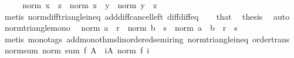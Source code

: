\begin{isabellebody}
%
\isadelimproof
%
\endisadelimproof
%
\isatagproof
{}\isamarkupfalse%
\ {\isacharminus}{\kern0pt}\isanewline
\ \ \isamarkupfalse%
\ {\isachardoublequoteopen}norm\ {\isacharparenleft}{\kern0pt}x\ {\isacharminus}{\kern0pt}\ z{\isacharparenright}{\kern0pt}\ {\isasymle}\ norm\ {\isacharparenleft}{\kern0pt}x\ {\isacharminus}{\kern0pt}\ y{\isacharparenright}{\kern0pt}\ {\isacharplus}{\kern0pt}\ norm\ {\isacharparenleft}{\kern0pt}y\ {\isacharminus}{\kern0pt}\ z{\isacharparenright}{\kern0pt}{\isachardoublequoteclose}\isanewline
\ \ \ \ \isamarkupfalse%
\ {\isacharparenleft}{\kern0pt}metis\ norm{\isacharunderscore}{\kern0pt}diff{\isacharunderscore}{\kern0pt}triangle{\isacharunderscore}{\kern0pt}ineq\ add{\isacharunderscore}{\kern0pt}diff{\isacharunderscore}{\kern0pt}cancel{\isacharunderscore}{\kern0pt}left{\isacharprime}{\kern0pt}\ diff{\isacharunderscore}{\kern0pt}diff{\isacharunderscore}{\kern0pt}eq{}{\isacharparenright}{\kern0pt}\isanewline
\ \ \isamarkupfalse%
\ that\ \isamarkupfalse%
\ {\isacharquery}{\kern0pt}thesis\ \isamarkupfalse%
\ auto\isanewline
{}\isamarkupfalse%
%
\endisatagproof
{\isafoldproof}%
%
\isadelimproof
\isanewline
%
\endisadelimproof
\isanewline
{}\isamarkupfalse%
\ norm{\isacharunderscore}{\kern0pt}triangle{\isacharunderscore}{\kern0pt}mono{\isacharcolon}{\kern0pt}\isanewline
\ \ {\isachardoublequoteopen}norm\ a\ {\isasymle}\ r\ {\isasymLongrightarrow}\ norm\ b\ {\isasymle}\ s\ {\isasymLongrightarrow}\ norm\ {\isacharparenleft}{\kern0pt}a\ {\isacharplus}{\kern0pt}\ b{\isacharparenright}{\kern0pt}\ {\isasymle}\ r\ {\isacharplus}{\kern0pt}\ s{\isachardoublequoteclose}\isanewline
%
\isadelimproof
\ \ %
\endisadelimproof
%
\isatagproof
{}\isamarkupfalse%
\ {\isacharparenleft}{\kern0pt}metis\ {\isacharparenleft}{\kern0pt}mono{\isacharunderscore}{\kern0pt}tags{\isacharparenright}{\kern0pt}\ add{\isacharunderscore}{\kern0pt}mono{\isacharunderscore}{\kern0pt}thms{\isacharunderscore}{\kern0pt}linordered{\isacharunderscore}{\kern0pt}semiring{\isacharparenleft}{\kern0pt}{}{\isacharparenright}{\kern0pt}\ norm{\isacharunderscore}{\kern0pt}triangle{\isacharunderscore}{\kern0pt}ineq\ order{\isachardot}{\kern0pt}trans{\isacharparenright}{\kern0pt}%
\endisatagproof
{\isafoldproof}%
%
\isadelimproof
\isanewline
%
\endisadelimproof
\isanewline
{}\isamarkupfalse%
\ norm{\isacharunderscore}{\kern0pt}sum{\isacharcolon}{\kern0pt}\ {\isachardoublequoteopen}norm\ {\isacharparenleft}{\kern0pt}sum\ f\ A{\isacharparenright}{\kern0pt}\ {\isasymle}\ {\isacharparenleft}{\kern0pt}{\isasymSum}i{\isasymin}A{\isachardot}{\kern0pt}\ norm\ {\isacharparenleft}{\kern0pt}f\ i{\isacharparenright}{\kern0pt}{\isacharparenright}{\kern0pt}{\isachardoublequoteclose}\isanewline

\end{isabellebody}
